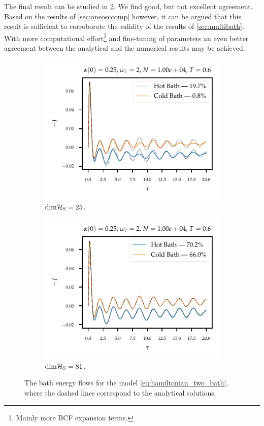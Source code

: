 The final result can be studied in \cref{fig:sufficient_levels}. We
find good, but not excellent agreement. Based on the results of
\cref{sec:oneosccomp} however, it can be argued that this result is
sufficient to corroborate the validity of the results of
\cref{sec:multibath}. With more computational effort\footnote{Mainly
  more BCF expansion terms.} and fine-tuning of parameters an even
better agreement between the analytical and the numerical results may
be achieved.
\begin{figure}[h]
  \centering
  \begin{subfigure}[t]{.49\linewidth}
    \includegraphics{figs/analytic_comp/comparison_two_5bcf_5ho.pdf}
    \caption{\label{fig:insufficient_levels}\(\mathrm{dim}\mathcal{H}_{\mathrm{S}}=25\).}
  \end{subfigure}
  \begin{subfigure}[t]{.49\linewidth}
    \includegraphics{figs/analytic_comp/comparison_two_ho.pdf}
    \caption{\label{fig:sufficient_levels}\(\mathrm{dim}\mathcal{H}_{\mathrm{S}}=81\).}
  \end{subfigure}
  \caption{\label{fig:comp_two_bath} The bath energy flows for
    the model \cref{eq:hamiltonian_two_bath}, where the dashed lines
    correspond to the analytical solutions.}
\end{figure}

